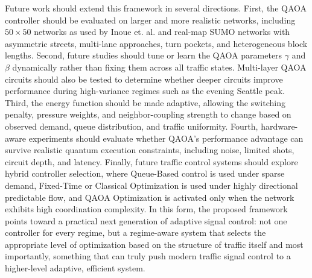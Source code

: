 \documentclass[12pt]{article}
\begin{document}
Future work should extend this framework in several directions. First, the QAOA controller should be evaluated on larger and more realistic networks, including $50 \times 50$ networks as used by Inoue et. al. \cite{inoue2021} and real-map SUMO networks with asymmetric streets, multi-lane approaches, turn pockets, and heterogeneous block lengths. Second, future studies should tune or learn the QAOA parameters $\gamma$ and $\beta$ dynamically rather than fixing them across all traffic states. Multi-layer QAOA circuits should also be tested to determine whether deeper circuits improve performance during high-variance regimes such as the evening Seattle peak. Third, the energy function should be made adaptive, allowing the switching penalty, pressure weights, and neighbor-coupling strength to change based on observed demand, queue distribution, and traffic uniformity. Fourth, hardware-aware experiments should evaluate whether QAOA's performance advantage can survive realistic quantum execution constraints, including noise, limited shots, circuit depth, and latency. Finally, future traffic control systems should explore hybrid controller selection, where Queue-Based control is used under sparse demand, Fixed-Time or Classical Optimization is used under highly directional predictable flow, and QAOA Optimization is activated only when the network exhibits high coordination complexity. In this form, the proposed framework points toward a practical next generation of adaptive signal control: not one controller for every regime, but a regime-aware system that selects the appropriate level of optimization based on the structure of traffic itself and most importantly, something that can truly push modern traffic signal control to a higher-level adaptive, efficient system.





\end{document}
